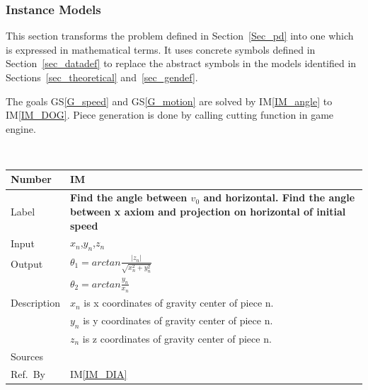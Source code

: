 \documentclass[12pt]{article}
\newcommand{\colAwidth}{0.13\textwidth}
\newcommand{\colBwidth}{0.82\textwidth}
\newcommand{\gsref}[1]{GS\ref{#1}}
\newcounter{instnum} %
\newcommand{\iref}[1]{IM\ref{#1}}
\begin{document}
	\subsubsection{Instance Models} \label{sec_instance}    
	
	This section transforms the problem defined in Section~\ref{Sec_pd} into 
	one which is expressed in mathematical terms. It uses concrete symbols defined 
	in Section~\ref{sec_datadef} to replace the abstract symbols in the models 
	identified in Sections~\ref{sec_theoretical} and~\ref{sec_gendef}.
	
	The goals \gsref{G_speed} and \gsref{G_motion} are solved by \iref{IM_angle} to \iref{IM_DOG}.
	Piece generation is done by calling cutting function in game engine.   
	
	~\newline
	
	
	\noindent
	\begin{minipage}{\textwidth}
		\renewcommand*{\arraystretch}{1.5}
		\begin{tabular}{| p{\colAwidth} | p{\colBwidth}|}
			\hline
			\rowcolor[gray]{0.9}
			Number& IM{instnum}\theinstnum \label{IM_angle}\\
			\hline
			Label& \bf Find the angle between $v_{0}$ and horizontal. Find the angle between x axiom and projection on horizontal of initial speed \\
			\hline
			Input&$x_{n}$,$y_{n}$,$z_{n}$\\
			\hline
			Output&$\theta_{1}=arctan \frac{|z_{n}|}{\sqrt{x_{n}^2+y_{n}^2}}$\\
			&$\theta_{2}=arctan \frac{y_{n}}{x_{n}}$\\
			\hline
			Description&$x_{n}$ is x coordinates of gravity center of piece n.\\
			&$y_{n}$ is y coordinates of gravity center of piece n.\\
			&$z_{n}$ is z coordinates of gravity center of piece n.\\
			\hline
			Sources&~\ \ \\
			\hline
			Ref.\ By & \iref{IM_DIA}\\
			\hline
		\end{tabular}
	\end{minipage}\\
	
	~\newline
	
\end{document}
